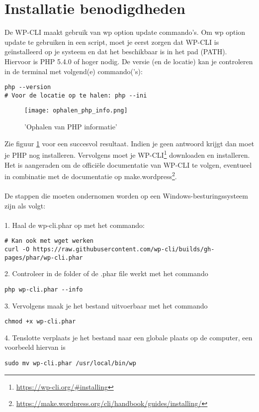 \section{Installatie benodigdheden}
De WP-CLI maakt gebruik van wp option update commando's. Om wp option update te gebruiken in een script, moet je eerst zorgen dat WP-CLI is geïnstalleerd op je systeem en dat het beschikbaar is in het pad (PATH). Hiervoor is PHP 5.4.0 of hoger nodig. De versie (en de locatie) kan je controleren in de terminal met volgend(e) commando('s):\begin{verbatim}
php --version
# Voor de locatie op te halen: php --ini
\end{verbatim}
\begin{figure}
    \caption{'Ophalen van PHP informatie'}
    \label{ophalen_php_info}
    \centering
    \texttt{[image: ophalen\_php\_info.png]}
\end{figure}Zie figuur \ref{ophalen_php_info} voor een succesvol resultaat. Indien je geen antwoord krijgt dan moet je PHP nog installeren. Vervolgens moet je WP-CLI\footnote{\href{https://wp-cli.org/\#installing}{https://wp-cli.org/\#installing}} downloaden en installeren. Het is aangeraden om de officiële documentatie van WP-CLI te volgen, eventueel in combinatie met de documentatie op make.wordpress\footnote{\href{https://make.wordpress.org/cli/handbook/guides/installing/}{https://make.wordpress.org/cli/handbook/guides/installing/}}. 
\\\\
De stappen die moeten ondernomen worden op een Windows-besturingssysteem zijn als volgt:
\\\\
1. Haal de wp-cli.phar op met het commando:
\begin{verbatim}
# Kan ook met wget werken
curl -O https://raw.githubusercontent.com/wp-cli/builds/gh-pages/phar/wp-cli.phar
\end{verbatim}
2. Controleer in de folder of de .phar file werkt met het commando
\begin{verbatim}
php wp-cli.phar --info
\end{verbatim}
3. Vervolgens maak je het bestand uitvoerbaar met het commando
\begin{verbatim}
chmod +x wp-cli.phar
\end{verbatim}
4. Tenslotte verplaats je het bestand naar een globale plaats op de computer, een voorbeeld hiervan is
\begin{verbatim}
sudo mv wp-cli.phar /usr/local/bin/wp
\end{verbatim}
